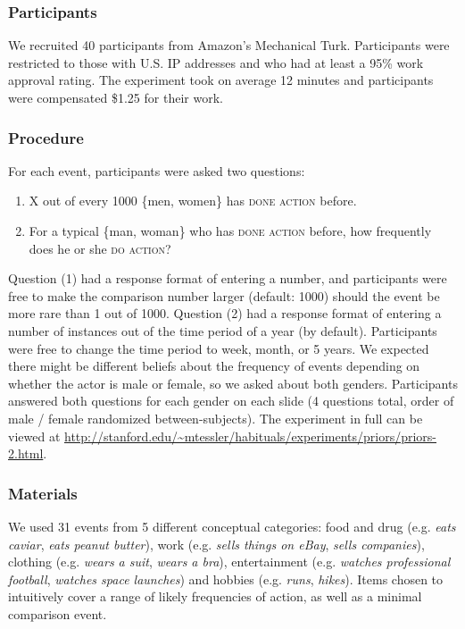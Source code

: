 \documentclass[10pt,letterpaper]{article}
\begin{document}
\subsubsection{Participants}
We recruited 40 participants from Amazon's Mechanical Turk.
Participants were restricted to those with U.S. IP addresses and who had at least a 95\% work approval rating.
The experiment took on average 12 minutes and participants were compensated \$1.25 for their work.

\subsubsection{Procedure}

For each event, participants were asked two questions:
\begin{enumerate}
\item X out of every 1000 \{men, women\} has \textsc{done action} before.
\item For a typical \{man, woman\} who has \textsc{done action} before, how frequently does he or she \textsc{do action}? 
\end{enumerate}

Question (1) had a response format of entering a number, and participants were free to make the comparison number larger (default: 1000) should the event be more rare than 1 out of 1000.
Question (2) had a response format of entering a number of instances out of the time period of a year (by default). Participants were free to change the time period to week, month, or 5 years.
We expected there might be different beliefs about the frequency of events depending on whether the actor is male or female, so we asked about both genders. Participants answered both questions for each gender on each slide (4 questions total, order of male / female randomized between-subjects).
The experiment in full can be viewed at \url{http://stanford.edu/~mtessler/habituals/experiments/priors/priors-2.html}.

\subsubsection{Materials}

We used 31 events from 5 different conceptual categories: food and drug (e.g. \emph{eats caviar}, \emph{eats peanut butter}), work (e.g. \emph{sells things on eBay}, \emph{sells companies}), clothing (e.g. \emph{wears a suit}, \emph{wears a bra}), entertainment (e.g. \emph{watches professional football}, \emph{watches space launches}) and hobbies (e.g. \emph{runs}, \emph{hikes}). 
Items chosen to intuitively cover a range of likely frequencies of action, as well as a minimal comparison event. 
\end{document}
